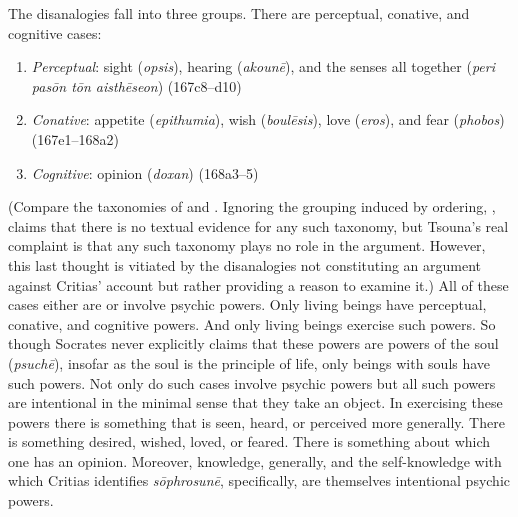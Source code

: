 The disanalogies fall into three groups. There are perceptual, conative, and cognitive cases:
\begin{enumerate}[(1)]
	\item \emph{Perceptual}: sight (\emph{opsis}), hearing (\emph{akounē}), and the senses all together (\emph{peri pasōn tōn aisthēseon}) (167c8–d10)
	\item \emph{Conative}: appetite (\emph{epithumia}), wish (\emph{boulēsis}), love (\emph{eros}), and fear (\emph{phobos}) (167e1–168a2)
	\item \emph{Cognitive}: opinion (\emph{doxan}) (168a3–5)
\end{enumerate}
(Compare the taxonomies of \citealt[114–8]{Hyland:1981aa} and \citealt[90]{Schmid:1998aa}. Ignoring the grouping induced by ordering, \citealt[207 n37]{Tsouna:2022aa}, claims that there is no textual evidence for any such taxonomy, but Tsouna's real complaint is that any such taxonomy plays no role in the argument. However, this last thought is vitiated by the disanalogies not constituting an argument against Critias' account but rather providing a reason to examine it.) All of these cases either are or involve psychic powers. Only living beings have perceptual, conative, and cognitive powers. And only living beings exercise such powers. So though Socrates never explicitly claims that these powers are powers of the soul (\emph{psuchē}), insofar as the soul is the principle of life, only beings with souls have such powers. Not only do such cases involve psychic powers but all such powers are intentional in the minimal sense that they take an object. In exercising these powers there is something that is seen, heard, or perceived more generally. There is something desired, wished, loved, or feared. There is something about which one has an opinion. Moreover, knowledge, generally, and the self-knowledge with which Critias identifies \emph{sōphrosunē}, specifically, are themselves intentional psychic powers.

